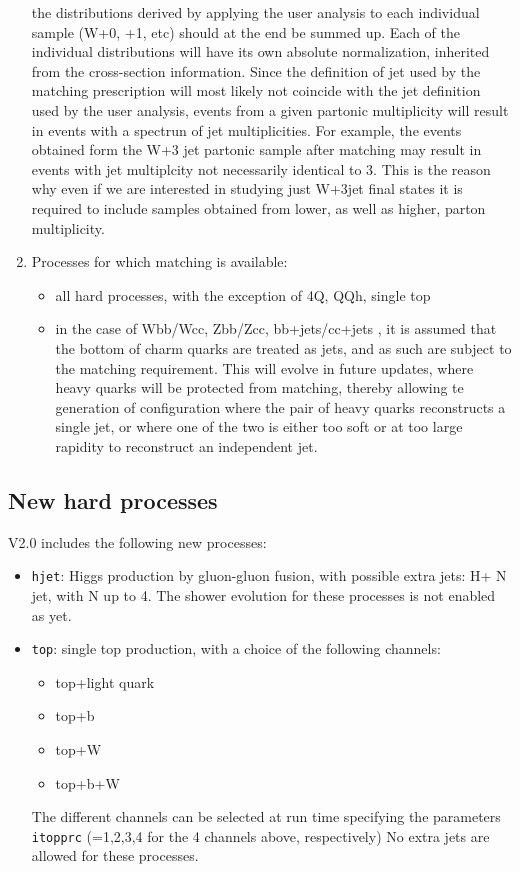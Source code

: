 \documentclass[paper]{JHEP3}
\begin{document}
\begin{appendix}
\begin{enumerate}
  the distributions derived by applying the user analysis to each
  individual sample (W+0, +1, etc) should at the end be summed
  up. Each of the individual distributions will have its own absolute
  normalization, inherited from the cross-section information.
  Since the definition of jet used by the matching prescription
  will most likely not coincide with the jet definition used by the
  user analysis, events from a given partonic multiplicity will
  result in events with a spectrun of jet multiplicities. For example,
  the events obtained form the W+3 jet partonic sample after matching
  may result in events with jet multiplcity not necessarily identical
  to 3. This is the reason why even if we are interested in studying
  just W+3jet final states it is required to include samples obtained
  from lower, as well as higher, parton multiplicity.
\item 
  Processes for which matching is available: 
  \begin{itemize}
  \item all hard processes, with the exception of 4Q, QQh, single top
  \item in the case of Wbb/Wcc, Zbb/Zcc, bb+jets/cc+jets , it is assumed
    that the bottom of charm quarks are treated as jets, and as such
    are subject to the matching requirement. This will evolve in future
    updates, where heavy quarks will be protected from matching,
    thereby allowing te generation of configuration where the pair of
    heavy quarks reconstructs a single jet, or where one of the two is
    either too soft or at too large rapidity to reconstruct an
    independent jet.
  \end{itemize} 
\end{enumerate}

\subsection{New hard processes}

V2.0 includes the following new processes:
\begin{itemize}
\item {\tt hjet}: Higgs production by gluon-gluon fusion, with possible extra
  jets: H+ N jet, with N up to 4. The shower evolution for these
  processes is not enabled as yet.
\item {\tt top}: single top production, with a choice of the following
  channels: 
  \begin{itemize}
  \item top+light quark
  \item top+b
  \item top+W
  \item top+b+W
  \end{itemize}
The different channels can be selected at run time specifying the
parameters {\tt itopprc} (=1,2,3,4 for the 4 channels above, respectively)
No extra jets are allowed for these processes.
\end{itemize} 


\end{appendix}
\end{document}

